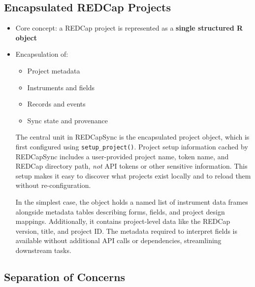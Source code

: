 \subsection{Encapsulated REDCap Projects}\label{encapsulated-redcap-projects}

\begin{itemize}
\item
  Core concept: a REDCap project is represented as a \textbf{single structured R object}
\item
  Encapsulation of:

  \begin{itemize}
  \tightlist
  \item
    Project metadata\\
  \item
    Instruments and fields\\
  \item
    Records and events\\
  \item
    Sync state and provenance
  \end{itemize}

  The central unit in REDCapSync is the encapsulated project object, which is first configured using \texttt{setup\_project()}. Project setup information cached by REDCapSync includes a user-provided project name, token name, and REDCap directory path, \emph{not} API tokens or other sensitive information. This setup makes it easy to discover what projects exist locally and to reload them without re-configuration.

  In the simplest case, the object holds a named list of instrument data frames alongside metadata tables describing forms, fields, and project design mappings. Additionally, it contains project-level data like the REDCap version, title, and project ID. The metadata required to interpret fields is available without additional API calls or dependencies, streamlining downstream tasks.
\end{itemize}

\subsection{Separation of Concerns}\label{separation-of-concerns}


